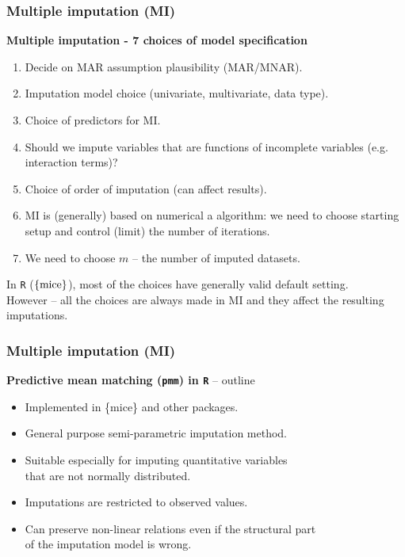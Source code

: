 \documentclass{beamer}
\begin{document}
\begin{frame}
\frametitle{Multiple imputation (MI)}
\textbf{Multiple imputation - 7 choices of model specification}\\
\smallskip
\begin{enumerate}
    \item Decide on MAR assumption plausibility (MAR/MNAR).
    \item Imputation model choice (univariate, multivariate, data type).
    \item Choice of predictors for MI.
    \item Should we impute variables that are functions of incomplete variables (e.g. interaction terms)?
    \item Choice of order of imputation (can affect results).
    \item MI is (generally) based on numerical a algorithm: we need to choose starting setup and control (limit) the number of iterations.
    \item We need to choose $m$ -- the number of imputed datasets.
\end{enumerate}
\smallskip
In \texttt{R} ($\{ \textnormal{mice} \}$), most of the choices have generally valid default setting.\\
\smallskip
However -- all the choices are always made in MI and they affect the resulting imputations.
\end{frame}
\begin{frame}
\frametitle{Multiple imputation (MI)}
\textbf{Predictive mean matching (\texttt{pmm}) in \texttt{R}} -- outline\\
\bigskip
\begin{itemize}
    \item Implemented in \{mice\} and other packages.
    \smallskip
    \item General purpose semi-parametric imputation method.
    \smallskip
    \item Suitable especially for imputing quantitative variables \\that are not normally distributed.
    \smallskip
    \item Imputations are restricted to observed values.
    \smallskip
    \item Can preserve non-linear relations even if the structural part \\of the imputation model is wrong.
\end{itemize}
\end{frame}
\end{document}
